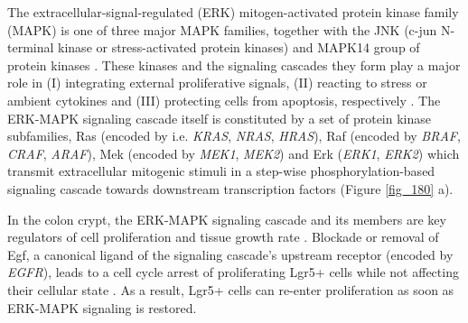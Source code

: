 \begin{flushleft}
The extracellular-signal-regulated (ERK) mitogen-activated protein kinase family (MAPK) is one of three major MAPK families, together with the JNK (c-jun N-terminal kinase or stress-activated protein kinases) and MAPK14 group of protein kinases \parencite{zhangMAPKSignalPathways2002}. These kinases and the signaling cascades they form play a major role in (I) integrating external proliferative signals, (II) reacting to stress or ambient cytokines and (III) protecting cells from apoptosis, respectively \parencite{fangMAPKSignallingPathways2005}. The ERK-MAPK signaling cascade itself is constituted by a set of protein kinase subfamilies, Ras (encoded by i.e. \textit{KRAS}, \textit{NRAS}, \textit{HRAS}), Raf (encoded by \textit{BRAF}, \textit{CRAF}, \textit{ARAF}), Mek (encoded by \textit{MEK1}, \textit{MEK2}) and Erk (\textit{ERK1}, \textit{ERK2}) which transmit extracellular mitogenic stimuli in a step-wise phosphorylation-based signaling cascade towards downstream transcription factors (Figure \ref{fig_180} a). \par

In the colon crypt, the ERK-MAPK signaling cascade and its members are key regulators of cell proliferation and tissue growth rate \parencite{hTalesCryptNew2019}. Blockade or removal of Egf, a canonical ligand of the signaling cascade's upstream receptor (encoded by \textit{EGFR}), leads to a cell cycle arrest of proliferating Lgr5+ cells while not affecting their cellular state \parencite{basakInducedQuiescenceLgr52017}. As a result, Lgr5+ cells can re-enter proliferation as soon as ERK-MAPK signaling is restored.
\par


\end{flushleft}
